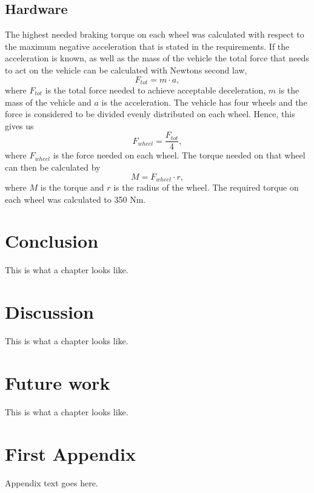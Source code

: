 \documentclass[a4paper,11pt]{kth-mag}
\begin{document}
\section*{Hardware}
The highest needed braking torque on each wheel was calculated with respect to the maximum negative acceleration that is stated in the requirements. If the acceleration is known, as well as the mass of the vehicle the total force that needs to act on the vehicle can be calculated with Newtons second law, 
\begin{equation}
F_{tot}=m\cdot a,
\end{equation}
where $F_{tot}$ is the total force needed to achieve acceptable deceleration, $m$ is the mass of the vehicle and $a$ is the acceleration. The vehicle has four wheels and the force is considered to be divided evenly distributed on each wheel. Hence, this gives us 
\begin{equation}
F_{wheel}=\frac{F_{tot}}{4},
\end{equation}
where $F_{wheel}$ is the force needed on each wheel. The torque needed on that wheel can then be calculated by 
\begin{equation}
M=F_{wheel}\cdot r,
\end{equation}
where $M$ is the torque and $r$ is the radius of the wheel. The required torque on each wheel was calculated to 350 Nm.

\chapter{Conclusion}
This is what a chapter looks like.

\chapter{Discussion}
This is what a chapter looks like.

\chapter{Future work}
This is what a chapter looks like.




\appendix
\addappheadtotoc
\chapter{First Appendix}

Appendix text goes here.
\glsaddall
\end{document}
